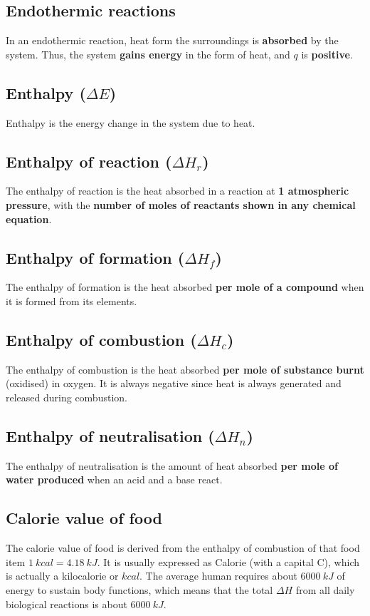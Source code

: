 \documentclass[11pt]{article}
\begin{document}
\subsection{Endothermic reactions}
\label{sec:orgd535f7e}
In an endothermic reaction, heat form the surroundings is \textbf{absorbed} by the system. Thus, the system \textbf{gains energy} in the form of heat, and \(q\) is \textbf{positive}.
\subsection{Enthalpy (\(\Delta E\))}
\label{sec:org3293e5c}
Enthalpy is the energy change in the system due to heat.
\subsection{Enthalpy of reaction (\(\Delta H_r\))}
\label{sec:orgec94192}
The enthalpy of reaction is the heat absorbed in a reaction at \textbf{1 atmospheric pressure}, with the \textbf{number of moles of reactants shown in any chemical equation}.
\subsection{Enthalpy of formation (\(\Delta H_f\))}
\label{sec:orga6ef988}
The enthalpy of formation is the heat absorbed \textbf{per mole of a compound} when it is formed from its elements.
\subsection{Enthalpy of combustion (\(\Delta H_c\))}
\label{sec:org695a3a7}
The enthalpy of combustion is the heat absorbed \textbf{per mole of substance burnt} (oxidised) in oxygen. It is always negative since heat is always generated and released during combustion.
\subsection{Enthalpy of neutralisation (\(\Delta H_n\))}
\label{sec:org3192bd0}
The enthalpy of neutralisation is the amount of heat absorbed \textbf{per mole of water produced} when an acid and a base react.

\newpage
\subsection{Calorie value of food}
\label{sec:orgf774b0f}
The calorie value of food is derived from the enthalpy of combustion of that food item \(\qty{1}{\unit{kcal}} = \qty{4.18}{kJ}\). It is usually expressed as Calorie (with a capital C), which is actually a kilocalorie or \(\unit{kcal}\). The average human requires about \(\qty{6000}{\unit{kJ}}\) of energy to sustain body functions, which means that the total \(\Delta H\) from all daily biological reactions is about \(\qty{6000}{\unit{kJ}}\).
\end{document}
